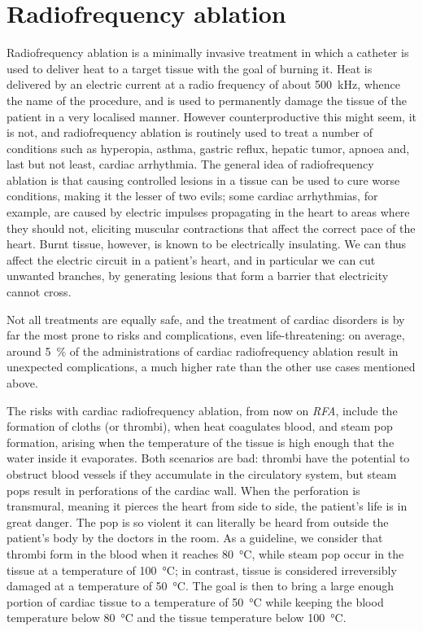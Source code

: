 \section{Radiofrequency ablation}
\label{sec_rfa}
Radiofrequency ablation is a minimally invasive treatment in which a catheter is used to deliver heat to a target tissue with the goal of burning it.
Heat is delivered by an electric current at a radio frequency of about \SI{500}{\kHz}, whence the name of the procedure, and is used to permanently damage the tissue of the patient in a very localised manner.
However counterproductive this might seem, it is not, and radiofrequency ablation is routinely used to treat a number of conditions such as hyperopia, asthma, gastric reflux, hepatic tumor, apnoea and, last but not least, cardiac arrhythmia.
The general idea of radiofrequency ablation is that causing controlled lesions in a tissue can be used to cure worse conditions, making it the lesser of two evils; some cardiac arrhythmias, for example, are caused by electric impulses propagating in the heart to areas where they should not, eliciting muscular contractions that affect the correct pace of the heart.
Burnt tissue, however, is known to be electrically insulating.
We can thus affect the electric circuit in a patient's heart, and in particular we can cut unwanted branches, by generating lesions that form a barrier that electricity cannot cross.

Not all treatments are equally safe, and the treatment of cardiac disorders is by far the most prone to risks and complications, even life-threatening: on average, around \SI{5}{\percent} of the administrations of cardiac radiofrequency ablation result in unexpected complications, a much higher rate than the other use cases mentioned above.

The risks with cardiac radiofrequency ablation, from now on \emph{RFA}, include the formation of cloths (or thrombi), when heat coagulates blood, and steam pop formation, arising when the temperature of the tissue is high enough that the water inside it evaporates.
Both scenarios are bad: thrombi have the potential to obstruct blood vessels if they accumulate in the circulatory system, but steam pops result in perforations of the cardiac wall.
When the perforation is transmural, meaning it pierces the heart from side to side, the patient's life is in great danger.
The pop is so violent it can literally be heard from outside the patient's body by the doctors in the room.
As a guideline, we consider that thrombi form in the blood when it reaches \SI{80}{\celsius}, while steam pop occur in the tissue at a temperature of \SI{100}{\celsius}; in contrast, tissue is considered irreversibly damaged at a temperature of \SI{50}{\celsius}.
The goal is then to bring a large enough portion of cardiac tissue to a temperature of \SI{50}{\celsius} while keeping the blood temperature below \SI{80}{\celsius} and the tissue temperature below \SI{100}{\celsius}.


